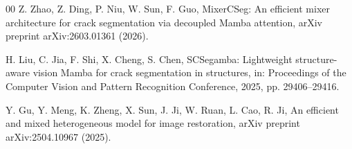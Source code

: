 \documentclass[preprint,12pt]{elsarticle}
\begin{document}
\begin{thebibliography}{00}
Z. Zhao, Z. Ding, P. Niu, W. Sun, F. Guo,
MixerCSeg: An efficient mixer architecture for crack segmentation via decoupled Mamba attention,
arXiv preprint arXiv:2603.01361 (2026).

H. Liu, C. Jia, F. Shi, X. Cheng, S. Chen,
SCSegamba: Lightweight structure-aware vision Mamba for crack segmentation in structures,
in: Proceedings of the Computer Vision and Pattern Recognition Conference, 2025, pp. 29406--29416.

Y. Gu, Y. Meng, K. Zheng, X. Sun, J. Ji, W. Ruan, L. Cao, R. Ji,
An efficient and mixed heterogeneous model for image restoration,
arXiv preprint arXiv:2504.10967 (2025).

\end{thebibliography}
\end{document}
